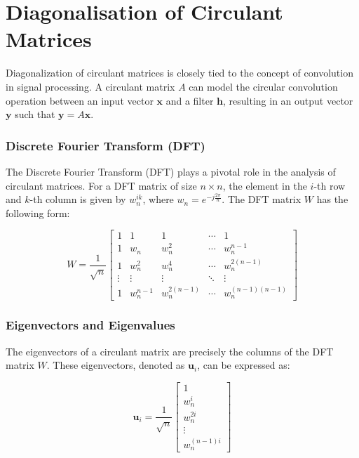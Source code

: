 \section{Diagonalisation of Circulant Matrices}

Diagonalization of circulant matrices is closely tied to the concept of convolution in signal processing. A circulant matrix \( A \) can model the circular convolution operation between an input vector \( \mathbf{x} \) and a filter \( \mathbf{h} \), resulting in an output vector \( \mathbf{y} \) such that \( \mathbf{y} = A\mathbf{x} \).

\subsubsection*{Discrete Fourier Transform (DFT)}

The Discrete Fourier Transform (DFT) plays a pivotal role in the analysis of circulant matrices. For a DFT matrix of size \( n \times n \), the element in the \( i \)-th row and \( k \)-th column is given by \( w_n^{ik} \), where \( w_n = e^{-j\frac{2\pi}{n}} \). The DFT matrix \( W \) has the following form:

\[
W = \frac{1}{\sqrt{n}} \begin{bmatrix} 
1 & 1 & 1 & \cdots & 1 \\
1 & w_n & w_n^2 & \cdots & w_n^{n-1} \\
1 & w_n^2 & w_n^4 & \cdots & w_n^{2(n-1)} \\
\vdots & \vdots & \vdots & \ddots & \vdots \\
1 & w_n^{n-1} & w_n^{2(n-1)} & \cdots & w_n^{(n-1)(n-1)}
\end{bmatrix}
\]

\subsubsection*{Eigenvectors and Eigenvalues}

The eigenvectors of a circulant matrix are precisely the columns of the DFT matrix \( W \). These eigenvectors, denoted as \( \mathbf{u}_i \), can be expressed as:

\[
\mathbf{u}_i = \frac{1}{\sqrt{n}} \begin{bmatrix}
1 \\
w_n^i \\
w_n^{2i} \\
\vdots \\
w_n^{(n-1)i}
\end{bmatrix}
\]

